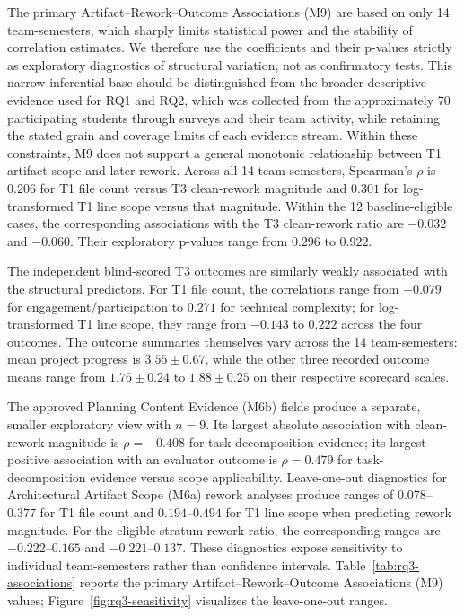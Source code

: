 The primary Artifact--Rework--Outcome Associations (M9) are based on only 14
team-semesters, which sharply limits statistical power and the stability of
correlation estimates. We therefore use the coefficients and their p-values
strictly as exploratory diagnostics of structural variation, not as
confirmatory tests. This narrow inferential base should be distinguished from
the broader descriptive evidence used for RQ1 and RQ2, which was collected
from the approximately 70 participating students through surveys and their
team activity, while retaining the stated grain and coverage limits of each
evidence stream. Within these constraints, M9 does not support a general
monotonic relationship between T1 artifact scope and later rework. Across all
14 team-semesters,
Spearman's $\rho$ is $0.206$ for T1 file count versus T3 clean-rework
magnitude and $0.301$ for log-transformed T1 line scope versus that magnitude.
Within the 12 baseline-eligible cases, the corresponding associations with the
T3 clean-rework ratio are $-0.032$ and $-0.060$. Their exploratory p-values
range from $0.296$ to $0.922$.

The independent blind-scored T3 outcomes are similarly weakly associated with
the structural predictors. For T1 file count, the correlations range from
$-0.079$ for engagement/participation to $0.271$ for technical complexity;
for log-transformed T1 line scope, they range from $-0.143$ to $0.222$ across
the four outcomes. The outcome summaries themselves vary across the 14
team-semesters: mean project progress is $3.55 \pm 0.67$, while the other
three recorded outcome means range from $1.76 \pm 0.24$ to $1.88 \pm 0.25$
on their respective scorecard scales.

The approved Planning Content Evidence (M6b) fields produce a separate, smaller
exploratory view with
$n=9$. Its largest absolute association with clean-rework magnitude is
$\rho=-0.408$ for task-decomposition evidence; its largest positive
association with an evaluator outcome is $\rho=0.479$ for task-decomposition
evidence versus scope applicability. Leave-one-out diagnostics for
Architectural Artifact Scope (M6a)
rework analyses produce ranges of $0.078$--$0.377$ for T1 file count and
$0.194$--$0.494$ for T1 line scope when predicting rework magnitude. For the
eligible-stratum rework ratio, the corresponding ranges are
$-0.222$--$0.165$ and $-0.221$--$0.137$. These diagnostics expose sensitivity
to individual team-semesters rather than confidence intervals.
Table~\ref{tab:rq3-associations} reports the primary
Artifact--Rework--Outcome Associations (M9) values;
Figure~\ref{fig:rq3-sensitivity} visualizes the leave-one-out ranges.

